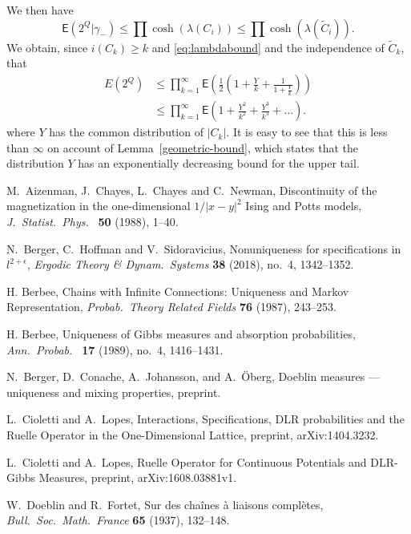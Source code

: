 \documentclass[11pt, a4paper]{amsart}
\theoremstyle{definition}
\theoremstyle{remark}
\providecommand{\qr}{\eqref}
\providecommand{\E}{\mathsf{E}}
\providecommand{\tl}{\tilde}
\begin{document}
We then have
$$
\E(2^Q | \gamma_- ) \leq \prod \cosh (\lambda(C_i))\leq \prod \cosh (\lambda (\tilde C_i)).
$$
We obtain, since $i(C_k)\geq k$ and \qr{eq:lambdabound} and the independence of
$\tl C_k$, that
\begin{align}
  E(2^Q) &\leq \prod_{k=1}^\infty \E\left(\frac{1}{2}\left(1+\frac{Y}{k}+\frac{1}{1+\frac{Y}{k}}\right) \right) \\
         &\leq \prod_{k=1}^\infty \E\left(1+\frac{Y^2}{k^2} + \frac{Y^3}{k^3} + \dots \right).
\end{align}
where $Y$ has the common distribution of $|C_k|$. It is easy to see that this is
less than $\infty$ on account of Lemma~\ref{geometric-bound}, which states that the
distribution $Y$ has an exponentially decreasing bound for the upper tail.


\begin{thebibliography}{999}

 M.\ Aizenman, J.\ Chayes, L.\ Chayes and C.\ Newman,
  Discontinuity of the magnetization in the one-dimensional
  $1/|x-y|^2$ Ising and Potts models, {\em J.\  Statist.\ Phys.\  } {\bf
    50} (1988), 1--40.
    
  N.\ Berger, C.\ Hoffman and V.\ Sidoravicius,
  Nonuniqueness for specifications in $l^{2+\epsilon}$,
  {\em Ergodic Theory \& Dynam.\ Systems} {\bf 38}
  (2018), no.\ 4, 1342--1352.   

 H. Berbee, Chains with Infinite Connections:
  Uniqueness and Markov Representation, {\em Probab.\ Theory Related
    Fields} {\bf 76} (1987), 243--253.
 
 H. Berbee, Uniqueness of Gibbs measures and
  absorption probabilities, {\em Ann.\ Probab.\ } {\bf 17} (1989),
  no.\ 4, 1416--1431.
 
N.\ Berger, D.\ Conache, A.\ Johansson, and A.\ \"Oberg, Doeblin measures --- uniqueness and mixing properties,
preprint. 
 
 L.\ Cioletti and A.\ Lopes, Interactions,
  Specifications, DLR probabilities and the Ruelle Operator in the
  One-Dimensional Lattice, preprint, arXiv:1404.3232.
 
 L.\ Cioletti and A.\ Lopes, Ruelle Operator for
  Continuous Potentials and DLR-Gibbs Measures, preprint,
  arXiv:1608.03881v1.
  
 W.\ Doeblin and R.\ Fortet, Sur des cha{\^i}nes
  {\`a} liaisons compl{\`e}tes, {\em Bull.\ Soc.\ Math.\ France} {\bf
    65} (1937), 132--148.
  

\end{thebibliography}
\end{document}
